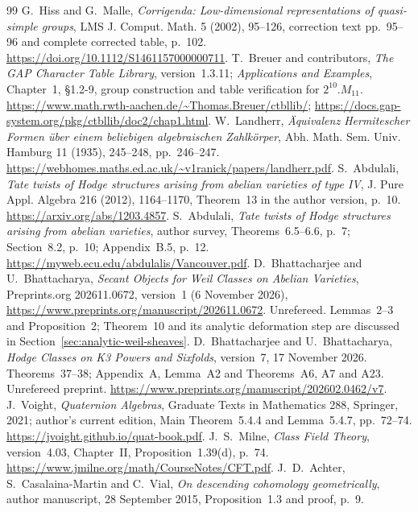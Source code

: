 \documentclass[11pt]{article}
\theoremstyle{definition}
\theoremstyle{remark}
\begin{document}
\begin{thebibliography}{99}
 G.~Hiss and G.~Malle, \emph{Corrigenda: Low-dimensional representations of quasi-simple groups}, LMS J. Comput. Math. 5 (2002), 95--126, correction text pp.~95--96 and complete corrected table, p.~102. \url{https://doi.org/10.1112/S1461157000000711}.
 T.~Breuer and contributors, \emph{The GAP Character Table Library}, version~1.3.11; \emph{Applications and Examples}, Chapter~1, \S1.2-9, group construction and table verification for $2^{10}.M_{11}$. \url{https://www.math.rwth-aachen.de/~Thomas.Breuer/ctbllib/}; \url{https://docs.gap-system.org/pkg/ctbllib/doc2/chap1.html}.
 W.~Landherr, \emph{\"Aquivalenz Hermitescher Formen \"uber einem beliebigen algebraischen Zahlk\"orper}, Abh. Math. Sem. Univ. Hamburg 11 (1935), 245--248, pp.~246--247. \url{https://webhomes.maths.ed.ac.uk/~v1ranick/papers/landherr.pdf}.
 S.~Abdulali, \emph{Tate twists of Hodge structures arising from abelian varieties of type IV}, J. Pure Appl. Algebra 216 (2012), 1164--1170, Theorem~13 in the author version, p.~10. \url{https://arxiv.org/abs/1203.4857}.
 S.~Abdulali, \emph{Tate twists of Hodge structures arising from abelian varieties}, author survey, Theorems~6.5--6.6, p.~7; Section~8.2, p.~10; Appendix~B.5, p.~12. \url{https://myweb.ecu.edu/abdulalis/Vancouver.pdf}.
 D.~Bhattacharjee and U.~Bhattacharya,
\emph{Secant Objects for Weil Classes on Abelian Varieties},
Preprints.org 202611.0672, version~1 (6 November 2026),
\url{https://www.preprints.org/manuscript/202611.0672}.
Unrefereed. Lemmas~2--3 and Proposition~2; Theorem~10 and its
analytic deformation step are discussed in Section~\ref{sec:analytic-weil-sheaves}.
 D.~Bhattacharjee and U.~Bhattacharya,
\emph{Hodge Classes on K3 Powers and Sixfolds}, version~7,
17 November 2026. Theorems~37--38; Appendix~A, Lemma~A2 and
Theorems~A6, A7 and A23.
Unrefereed preprint.
\url{https://www.preprints.org/manuscript/202602.0462/v7}.
 J.~Voight, \emph{Quaternion Algebras},
Graduate Texts in Mathematics 288, Springer, 2021; author's current
edition, Main Theorem~5.4.4 and Lemma~5.4.7, pp.~72--74.
\url{https://jvoight.github.io/quat-book.pdf}.
 J.~S.~Milne, \emph{Class Field Theory},
version~4.03, Chapter~II, Proposition~1.39(d), p.~74.
\url{https://www.jmilne.org/math/CourseNotes/CFT.pdf}.
 J.~D.~Achter, S.~Casalaina-Martin and C.~Vial,
\emph{On descending cohomology geometrically}, author manuscript,
28 September 2015, Proposition~1.3 and proof, p.~9.

\end{thebibliography}
\end{document}
